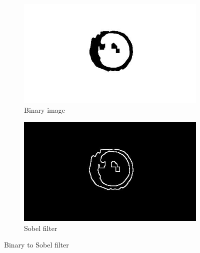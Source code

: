 \documentclass{article}
\begin{document}
%
%
\begin{figure}[H]
\centering

\begin{subfigure}{.5\textwidth}
  \centering
  \includegraphics[width=0.9\linewidth]{res/pupil/results/lowgray_to_bin.jpg}
  \caption{Binary image}
  \label{fig:original_img}
\end{subfigure}%
\begin{subfigure}{.5\textwidth}
  \centering
  \includegraphics[width=0.9\linewidth]{res/pupil/results/bin_to_sobel.jpg}
  \caption{Sobel filter}
  \label{fig:gray_img}
\end{subfigure}


\caption{Binary to Sobel filter}
\label{fig:result_pup_bin_to_sobel}
\end{figure}
\end{document}
